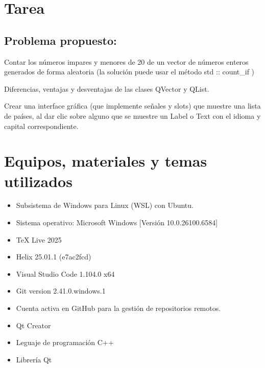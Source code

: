 \section{Tarea}

\subsection{Problema propuesto: }

\begin{enumerate}[label={[\arabic*]}]
    \item Contar los números impares y menores de 20 de un vector de números enteros generados de forma aleatoria (la solución puede usar el método std :: count\_if ) 
    \item Diferencias, ventajas y desventajas de las clases QVector y QList. 
    \item Crear una interface gráfica (que implemente señales y slots) que muestre una lista de países, al dar clic sobre alguno que se muestre un Label o Text con el idioma y capital correspondiente.
\end{enumerate}




\section{Equipos, materiales y temas utilizados}

\begin{itemize}
    \item Subsistema de Windows para Linux (WSL) con Ubuntu.
    \item Sistema operativo: Microsoft Windows [Versión 10.0.26100.6584]
    \item TeX Live 2025
    \item Helix 25.01.1 (e7ac2fcd)
    \item Visual Studio Code 1.104.0 x64
    \item Git version 2.41.0.windows.1
    \item Cuenta activa en GitHub para la gestión de repositorios remotos.
    \item Qt Creator
    \item Leguaje de programación C++
    \item Librería Qt
\end{itemize}




